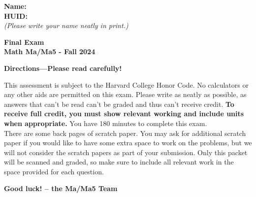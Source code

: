 \documentclass{article}
\begin{document}
\noindent
{\large \mbox{} \hfill \bf Name:\underline{\hspace{3in}}}\\

{\large \mbox{} \hfill \bf HUID:\underline{\hspace{3in}}}\\
{\mbox{} \hfill \it (Please write your name neatly in print.)}\\


 
\medskip
 
\noindent
{\large\bf
Final Exam \\ Math Ma/Ma5 - Fall 2024}
\noindent


{\Large
\begin{center}\textbf{Directions---Please read carefully!} \end{center}}




This assessment is subject to the Harvard College Honor Code. No calculators or any other aids are permitted on this exam.  Please write as neatly as possible, as answers that can't be read can't be graded and thus can't receive credit. {\bf To receive full credit, you must show relevant working
and include units when appropriate.} You have 180 minutes to complete this exam.   \\

There are some back pages of scratch paper. You may ask for additional scratch paper if you would like to have some extra space to work on the problems, but we will not consider the scratch papers as part of your submission. Only this packet will be scanned and graded, so make sure to include all relevant work in the space provided for each question. 

\begin{center}\textbf{Good luck! -- the Ma/Ma5 Team}\end{center}
\end{document}

